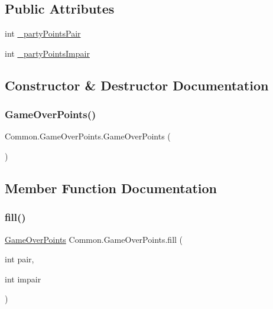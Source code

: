 \subsection*{Public Attributes}
\begin{DoxyCompactItemize}
\item 
int \mbox{\hyperlink{classCommon_1_1GameOverPoints_ac9113051b20fd8ee19d3750ca473f84d}{\+\_\+party\+Points\+Pair}}
\item 
int \mbox{\hyperlink{classCommon_1_1GameOverPoints_adde432d194bd142b2b2b45d4b2518c49}{\+\_\+party\+Points\+Impair}}
\end{DoxyCompactItemize}


\subsection{Constructor \& Destructor Documentation}
\mbox{\label{classCommon_1_1GameOverPoints_afd6a3a2856a80e9a787ede65388d80d1}} 
\subsubsection{\texorpdfstring{Game\+Over\+Points()}{GameOverPoints()}}
{\footnotesize\ttfamily Common.\+Game\+Over\+Points.\+Game\+Over\+Points (\begin{DoxyParamCaption}{ }\end{DoxyParamCaption})\hspace{0.3cm}{\ttfamily [inline]}}



\subsection{Member Function Documentation}
\mbox{\label{classCommon_1_1GameOverPoints_a469f01f2db6a2e36783f9728cd91e090}} 
\subsubsection{\texorpdfstring{fill()}{fill()}}
{\footnotesize\ttfamily \mbox{\hyperlink{classCommon_1_1GameOverPoints}{Game\+Over\+Points}} Common.\+Game\+Over\+Points.\+fill (\begin{DoxyParamCaption}\item[{int}]{pair,  }\item[{int}]{impair }\end{DoxyParamCaption})\hspace{0.3cm}{\ttfamily [inline]}}

